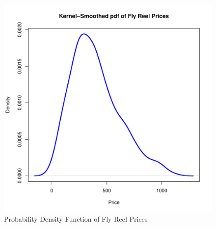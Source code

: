 \begin{figure}[h!]
  \centering
  \includegraphics[scale = 0.5, keepaspectratio=true]{../Figures/density_prices}
  \caption{Probability Density Function of Fly Reel Prices} \label{fig:density_prices}
\end{figure}



% 
